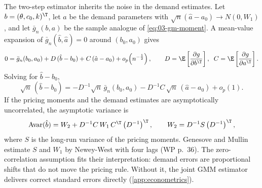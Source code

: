 The two-step estimator inherits the noise in the demand estimates. Let $b = (\theta, c_0, k)^\T$, let $a$ be
the demand parameters with $\sqrt{n}(\hat a - a_0) \to N(0, W_1)$, and let $\bar g_n(b, a)$ be the sample
analogue of \eqref{eq:03-gm-moment}. A mean-value expansion of $\bar g_n(\hat b, \hat a) = 0$ around
$(b_0, a_0)$ gives
\begin{equation*}
0 = \bar g_n(b_0, a_0) + D\,(\hat b - b_0) + C\,(\hat a - a_0) + o_p\!\left(n^{-\frac{1}{2}}\right),
\qquad D = \E\left[\frac{\partial g}{\partial b^\T}\right],\;\; C = \E\left[\frac{\partial g}{\partial a^\T}\right].
\end{equation*}
Solving for $\hat b - b_0$,
\begin{equation*}
\sqrt{n}\,(\hat b - b_0) = -D^{-1}\sqrt{n}\,\bar g_n(b_0, a_0) - D^{-1}C\,\sqrt{n}\,(\hat a - a_0) + o_p(1).
\end{equation*}
If the pricing moments and the demand estimates are asymptotically uncorrelated, the asymptotic variance is
\begin{equation}\label{eq:03-gm-variance}
\operatorname{Avar}(\hat b) = W_2 + D^{-1} C\, W_1\, C^\T \left(D^{-1}\right)^\T,
\qquad W_2 = D^{-1} S \left(D^{-1}\right)^\T ,
\end{equation}
where $S$ is the long-run variance of the pricing moments. Genesove and Mullin estimate $S$ and $W_1$ by
Newey-West with four lags (WP p.~36). The zero-correlation assumption fits their interpretation: demand errors
are proportional shifts that do not move the pricing rule. Without it, the joint GMM estimator delivers
correct standard errors directly (\cref{app:econometrics}).

